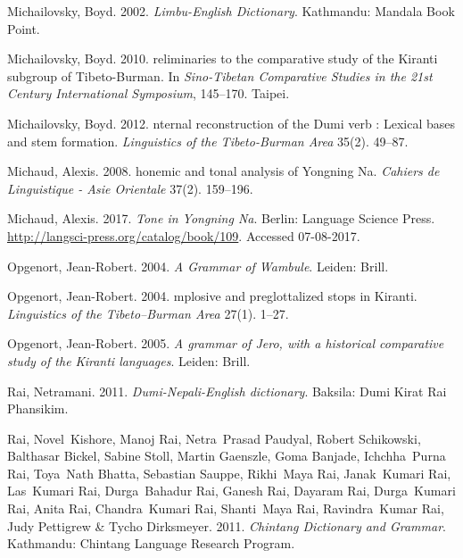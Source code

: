 \documentclass[oneside,a4paper,11pt]{article}
\begin{document}
\begin{thebibliography}{65}
Michailovsky, Boyd. 2002.
\newblock \emph{{L}imbu-{E}nglish {D}ictionary}.
\newblock Kathmandu: Mandala Book Point.

Michailovsky, Boyd. 2010.
reliminaries to the comparative study of the {K}iranti subgroup of
  {T}ibeto-{B}urman.
\newblock In \emph{{S}ino-{T}ibetan {C}omparative {S}tudies in the 21st
  {C}entury {I}nternational {S}ymposium}, 145--170. Taipei.

Michailovsky, Boyd. 2012.
nternal reconstruction of the {D}umi verb : {L}exical bases and
  stem formation.
\newblock \emph{Linguistics of the Tibeto-Burman Area} 35(2). 49--87.

Michaud, Alexis. 2008.
honemic and tonal analysis of {Y}ongning {N}a.
\newblock \emph{Cahiers de Linguistique - Asie Orientale} 37(2). 159--196.

Michaud, Alexis. 2017.
\newblock \emph{{T}one in {Y}ongning {N}a}.
\newblock Berlin: Language Science Press.
\newblock \urlprefix\url{http://langsci-press.org/catalog/book/109}. Accessed 07-08-2017.

Opgenort, Jean-Robert. 2004{}.
\newblock \emph{{A} {G}rammar of {W}ambule}.
\newblock Leiden: Brill.

Opgenort, Jean-Robert. 2004{}.
mplosive and preglottalized stops in {K}iranti.
\newblock \emph{Linguistics of the Tibeto–Burman Area} 27(1). 1–27.

Opgenort, Jean-Robert. 2005.
\newblock \emph{{A} grammar of {J}ero, with a historical comparative study of
  the {K}iranti languages}.
\newblock Leiden: Brill.

Rai, Netramani. 2011.
\newblock \emph{{D}umi-{N}epali-{E}nglish dictionary}.
\newblock Baksila: Dumi Kirat Rai Phansikim.

Rai, Novel~Kishore, Manoj Rai, Netra~Prasad Paudyal, Robert Schikowski,
  Balthasar Bickel, Sabine Stoll, Martin Gaenszle, Goma Banjade, Ichchha~Purna
  Rai, Toya~Nath Bhatta, Sebastian Sauppe, Rikhi~Maya Rai, Janak~Kumari Rai,
  Las~Kumari Rai, Durga~Bahadur Rai, Ganesh Rai, Dayaram Rai, Durga~Kumari Rai,
  Anita Rai, Chandra~Kumari Rai, Shanti~Maya Rai, Ravindra~Kumar Rai, Judy
  Pettigrew \& Tycho Dirksmeyer. 2011.
\newblock \emph{{C}hintang {D}ictionary and {G}rammar}.
\newblock Kathmandu: Chintang Language Research Program.


\end{thebibliography}
\end{document}
